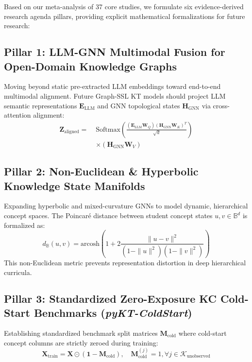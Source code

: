 \documentclass[10pt,journal,compsoc]{IEEEtran}
\begin{document}
Based on our meta-analysis of 37 core studies, we formulate six evidence-derived research agenda pillars, providing explicit mathematical formalizations for future research:

\subsection{Pillar 1: LLM-GNN Multimodal Fusion for Open-Domain Knowledge Graphs}
Moving beyond static pre-extracted LLM embeddings toward end-to-end multimodal alignment. Future Graph-SSL KT models should project LLM semantic representations $\mathbf{E}_{\text{LLM}}$ and GNN topological states $\mathbf{H}_{\text{GNN}}$ via cross-attention alignment:
\begin{equation}
\begin{split}
\mathbf{Z}_{\text{aligned}} = \; & \text{Softmax}\left(\frac{(\mathbf{E}_{\text{LLM}}\mathbf{W}_Q)(\mathbf{H}_{\text{GNN}}\mathbf{W}_K)^T}{\sqrt{d}}\right) \\
& \times (\mathbf{H}_{\text{GNN}}\mathbf{W}_V)
\end{split}
\end{equation}

\subsection{Pillar 2: Non-Euclidean \& Hyperbolic Knowledge State Manifolds}
Expanding hyperbolic and mixed-curvature GNNs to model dynamic, hierarchical concept spaces. The Poincaré distance between student concept states $u, v \in \mathbb{B}^d$ is formalized as:
\begin{equation}
d_{\mathbb{B}}(u, v) = \text{arcosh}\left(1 + 2 \frac{\|u - v\|^2}{(1 - \|u\|^2)(1 - \|v\|^2)}\right)
\end{equation}
This non-Euclidean metric prevents representation distortion in deep hierarchical curricula.

\subsection{Pillar 3: Standardized Zero-Exposure KC Cold-Start Benchmarks (\emph{pyKT-ColdStart})}
Establishing standardized benchmark split matrices $\mathbf{M}_{\text{cold}}$ where cold-start concept columns are strictly zeroed during training:
\begin{equation}
\mathbf{X}_{\text{train}} = \mathbf{X} \odot (\mathbf{1} - \mathbf{M}_{\text{cold}}), \quad \mathbf{M}_{\text{cold}}^{(j)} = 1, \forall j \in \mathcal{K}_{\text{unobserved}}
\end{equation}
\end{document}
